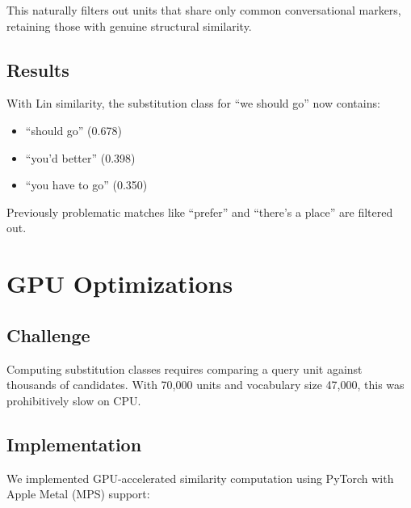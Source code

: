 \documentclass[11pt,a4paper]{article}
\begin{document}
This naturally filters out units that share only common conversational markers, retaining those with genuine structural similarity.

\subsection{Results}

With Lin similarity, the substitution class for ``we should go'' now contains:
\begin{itemize}
    \item ``should go'' (0.678)
    \item ``you'd better'' (0.398)
    \item ``you have to go'' (0.350)
\end{itemize}

Previously problematic matches like ``prefer'' and ``there's a place'' are filtered out.

\section{GPU Optimizations}

\subsection{Challenge}

Computing substitution classes requires comparing a query unit against thousands of candidates. With 70,000 units and vocabulary size 47,000, this was prohibitively slow on CPU.

\subsection{Implementation}

We implemented GPU-accelerated similarity computation using PyTorch with Apple Metal (MPS) support:
\end{document}
